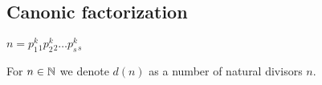 \subsection{Canonic factorization}

\begin{definition}[]
	$n = p_1^k_1 p_2^k_2 \dots p_s^k_s$
\end{definition}

\begin{definition}[]
	For $n \in \mathbb{N}$ we denote $d(n)$ as a number of natural divisors $n$.
\end{definition}
